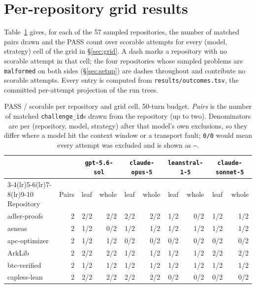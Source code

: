 \documentclass{article}
\begin{document}
\section{Per-repository grid results}
\label{app:perrepo}

Table~\ref{tab:perrepo} gives, for each of the 57 sampled repositories, the number of
matched pairs drawn and the PASS count over scorable attempts for every (model, strategy) cell
of the grid in \S\ref{sec:grid}. A dash marks a repository with no scorable attempt in that
cell; the four repositories whose sampled problems are \texttt{malformed} on both sides
(\S\ref{sec:setup}) are dashes throughout and contribute no scorable attempts. Every entry is
computed from \texttt{results/outcomes.tsv}, the committed per-attempt projection of the run
trees.

\begin{table}[h]
  \caption{PASS / scorable per repository and grid cell, 50-turn budget. \emph{Pairs} is the
  number of matched \texttt{challenge\_id}s drawn from the repository (up to two). Denominators
  are per (repository, model, strategy) after that model's own exclusions, so they differ where
  a model hit the context window or a transport fault; \texttt{0/0} would mean every attempt was
  excluded and is shown as \texttt{---}.}
  \label{tab:perrepo}
  \centering
  \scriptsize
  \setlength{\tabcolsep}{3pt}
  \begin{tabular}{lrrrrrrrrr}
    \toprule
    & & \multicolumn{2}{c}{\texttt{gpt-5.6-sol}} & \multicolumn{2}{c}{\texttt{claude-opus-5}}
      & \multicolumn{2}{c}{\texttt{leanstral-1-5}} & \multicolumn{2}{c}{\texttt{claude-sonnet-5}} \\
    \cmidrule(lr){3-4}\cmidrule(lr){5-6}\cmidrule(lr){7-8}\cmidrule(lr){9-10}
    Repository & Pairs & leaf & whole & leaf & whole & leaf & whole & leaf & whole \\
    \midrule
    adler-proofs & 2 & 2/2 & 2/2 & 2/2 & 2/2 & 1/2 & 0/2 & 1/2 & 1/2 \\
    aeneas & 2 & 1/2 & 0/2 & 1/2 & 1/2 & 1/2 & 1/2 & 1/2 & 1/2 \\
    apc-optimizer & 2 & 1/2 & 1/2 & 0/2 & 0/2 & 0/2 & 0/2 & 0/2 & 0/2 \\
    ArkLib & 2 & 2/2 & 2/2 & 1/2 & 1/2 & 1/2 & 1/2 & 2/2 & 2/2 \\
    btc-verified & 2 & 1/2 & 1/2 & 1/2 & 1/2 & 1/2 & 1/2 & 1/2 & 1/2 \\
    capless-lean & 2 & 2/2 & 2/2 & 2/2 & 2/2 & 0/2 & 0/2 & 0/2 & 0/2 \\

\end{tabular}
\end{table}
\end{document}
